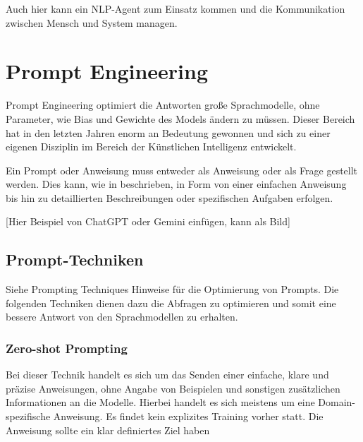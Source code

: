 Auch hier kann ein NLP-Agent zum Einsatz kommen und die Kommunikation zwischen Mensch und System managen.



\section{Prompt Engineering}
Prompt Engineering optimiert die Antworten große Sprachmodelle, ohne Parameter, wie Bias und Gewichte des Models ändern zu müssen. Dieser Bereich hat in den letzten Jahren enorm an Bedeutung gewonnen und sich zu einer eigenen Disziplin im Bereich der Künstlichen Intelligenz entwickelt.\vspace{0.2cm}

Ein Prompt oder Anweisung muss entweder als Anweisung oder als Frage gestellt werden. Dies kann, wie in \cite{amatriain-2024} beschrieben, in Form von einer einfachen Anweisung bis hin zu detaillierten Beschreibungen oder spezifischen Aufgaben erfolgen.\vspace{0.2cm}

[Hier Beispiel von ChatGPT oder Gemini einfügen, kann als Bild]


\subsection{Prompt-Techniken}
Siehe Prompting Techniques Hinweise für die Optimierung von Prompts.
Die folgenden Techniken dienen dazu die Abfragen zu optimieren und somit eine bessere Antwort von den Sprachmodellen zu erhalten.


\subsubsection{Zero-shot Prompting}
Bei dieser Technik handelt es sich um das Senden einer einfache, klare und präzise Anweisungen, ohne Angabe von Beispielen und sonstigen zusätzlichen Informationen an die Modelle. Hierbei handelt es sich meistens um eine Domain-spezifische Anweisung. Es findet kein explizites Training vorher statt. Die Anweisung sollte ein klar definiertes Ziel haben\vspace{0.2cm}



